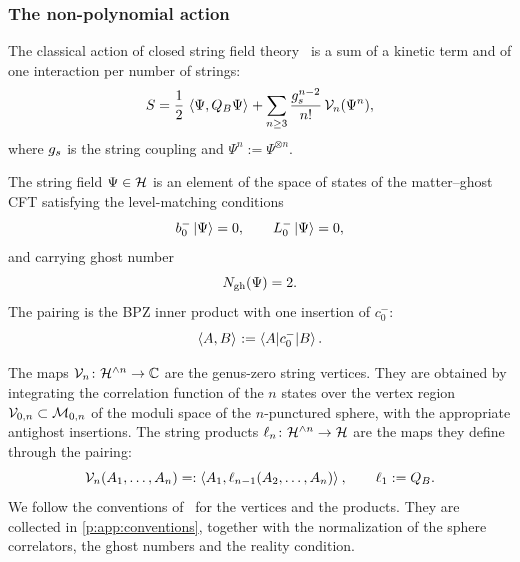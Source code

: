 \subsubsection{The non-polynomial action}
\label{p:sec:hs:action}

The classical action of closed string field theory~\cite{Zwiebach:1993:ClosedStringField} is a sum of a kinetic term and of one interaction per number of strings:
\begin{equation}
  \label{p:eq:hs1:action}
  S
    = \frac{1}{2} \, \braket{\Psi, Q_B \Psi}_{}
      + \sum_{n \ge 3} \frac{g_s^{n-2}}{n!} \, \mathcal{V}_{n}(\Psi^n),
\end{equation}
where $g_s$ is the string coupling and $\Psi^n := \Psi^{\otimes n}$.

The string field $\Psi \in \mathcal{H}$ is an element of the space of states of the matter--ghost CFT satisfying the level-matching conditions
\begin{equation}
  \label{p:eq:hs1:level-matching}
  b_0^- \ket{\Psi}
    = 0,
  \qquad
  L_0^- \ket{\Psi}
    = 0,
\end{equation}
and carrying ghost number
\begin{equation}
  \label{p:eq:hs1:ghost-psi}
  N_{\text{gh}}(\Psi)
    = 2.
\end{equation}
The pairing is the BPZ inner product with one insertion of $c_0^-$:
\begin{equation}
  \label{p:eq:hs1:pairing}
  \braket{A, B}_{}
    := \braket{A | c_0^- | B}.
\end{equation}

The maps $\mathcal{V}_{n} \colon \mathcal{H}^{\wedge n} \to \mathbb{C}$ are the genus-zero string vertices.
They are obtained by integrating the correlation function of the $n$ states over the vertex region $\mathcal V_{0,n} \subset {\mathcal{M}}_{0,n}$ of the moduli space of the $n$-punctured sphere, with the appropriate antighost insertions.
The string products $\ell_n \colon \mathcal{H}^{\wedge n} \to \mathcal{H}$ are the maps they define through the pairing:
\begin{equation}
  \label{p:eq:hs1:vertex-product}
  \mathcal{V}_{n}(A_1, \ldots, A_n)
    =: \braket{A_1, \ell_{n-1}(A_2, \ldots, A_n)}_{},
  \qquad
  \ell_1
    := Q_B.
\end{equation}
We follow the conventions of~\cite{Erbin:2021:StringFieldTheory} for the vertices and the products.
They are collected in \cref{p:app:conventions}, together with the normalization of the sphere correlators, the ghost numbers and the reality condition.

